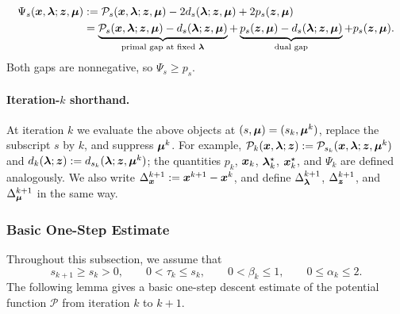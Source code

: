 \begin{equation}
\begin{aligned}
    \Psi_s(\bm{x},\bm{\lambda};\bm{z},\bm{\mu})
    &:={}
    \mathcal P_s(\bm{x},\bm{\lambda};\bm{z},\bm{\mu})
    -2d_s(\bm{\lambda};\bm{z},\bm{\mu})
    +2p_s(\bm{z},\bm{\mu}) \\
    &= \underbrace{\mathcal P_s(\bm{x},\bm{\lambda};\bm{z},\bm{\mu})-d_s(\bm{\lambda};\bm{z},\bm{\mu})}_{\text{primal gap at fixed }\bm{\lambda}}
     + \underbrace{p_s(\bm{z},\bm{\mu})-d_s(\bm{\lambda};\bm{z},\bm{\mu})}_{\text{dual gap}}
     + p_s(\bm{z},\bm{\mu}).
\end{aligned}
\label{eq:lyapunov-decomposition}
\end{equation}
Both gaps are nonnegative, so $\Psi_s\ge p_s$.

\paragraph{Iteration-$k$ shorthand.}
At iteration $k$ we evaluate the above objects at $(s,\bm{\mu})=(s_k,\bm{\mu}^k)$,
replace the subscript $s$ by $k$, and suppress $\bm{\mu}^k$. For example,
$\mathcal P_k(\bm{x},\bm{\lambda};\bm{z}):=\mathcal P_{s_k}(\bm{x},\bm{\lambda};\bm{z},\bm{\mu}^k)$ and
$d_k(\bm{\lambda};\bm{z}):=d_{s_k}(\bm{\lambda};\bm{z},\bm{\mu}^k)$; the quantities
$p_k$, $\bm{x}_k$, $\bm{\lambda}_k^\star$, $\bm{x}_k^\star$, and $\Psi_k$ are defined
analogously. We also write
$\Delta_{\bm{x}}^{k+1}:=\bm{x}^{k+1}-\bm{x}^k$, and define
$\Delta_{\bm{\lambda}}^{k+1}$, $\Delta_{\bm{z}}^{k+1}$, and $\Delta_{\bm{\mu}}^{k+1}$
in the same way.

\subsubsection{Basic One-Step Estimate}
\label{subsec:basic-one-step}

Throughout this subsection, we assume that 
\begin{equation}
    s_{k+1}\ge s_k>0,\qquad
    0 < \tau_k\le s_k,\qquad
    0<\beta_k\le1,\qquad
    0\le\alpha_k\le2.
    \label{eq:basic-parameter-condition}
\end{equation} 
The following lemma gives a basic one-step descent estimate of the potential function $\mathcal P$ from iteration $k$ to $k+1$.

